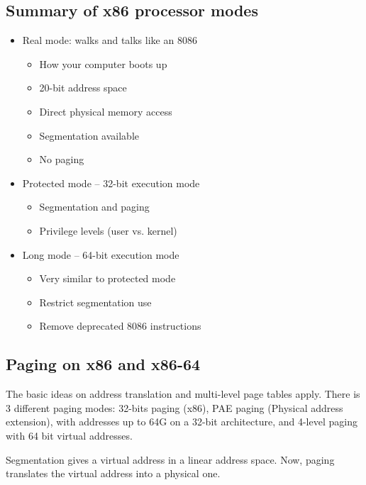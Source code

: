\documentclass[toc]{../cs-classes/cs-classes}
\begin{document}
\subsection{Summary of x86 processor modes}
\begin{itemize}
    \item Real mode: walks and talks like an 8086
    \begin{itemize}
        \item How your computer boots up
        \item 20-bit address space
        \item Direct physical memory access
        \item Segmentation available
        \item No paging
    \end{itemize}
    \item Protected mode -- 32-bit execution mode
    \begin{itemize}
        \item Segmentation and paging
        \item Privilege levels (user vs. kernel)
    \end{itemize}
    \item Long mode -- 64-bit execution mode
    \begin{itemize}
        \item Very similar to protected mode
        \item Restrict segmentation use
        \item Remove deprecated 8086 instructions
    \end{itemize}
\end{itemize}

\subsection{Paging on x86 and x86-64}
The basic ideas on address translation and multi-level page tables apply. There is 3 different paging modes: 32-bits paging (x86), PAE paging (Physical address extension), with addresses up to 64G on a 32-bit architecture, and 4-level paging with 64 bit virtual addresses.

Segmentation gives a virtual address in a linear address space. Now, paging translates the virtual address into a physical one.
\end{document}
